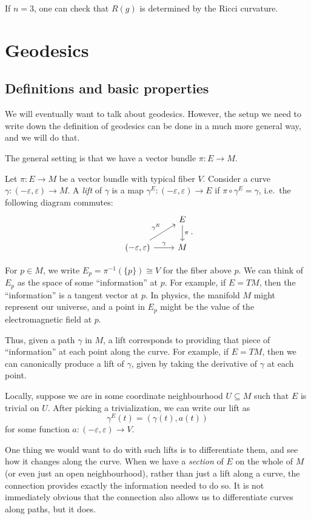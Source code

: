\documentclass[a4paper]{article}
\begin{document}
If $n = 3$, one can check that $R(g)$ is determined by the Ricci curvature.

\section{Geodesics}
\subsection{Definitions and basic properties}
We will eventually want to talk about geodesics. However, the setup we need to write down the definition of geodesics can be done in a much more general way, and we will do that.

The general setting is that we have a vector bundle $\pi: E \to M$.
\begin{defi}[Lift]
  Let $\pi: E \to M$ be a vector bundle with typical fiber $V$. Consider a curve $\gamma: (-\varepsilon, \varepsilon) \to M$. A \emph{lift} of $\gamma$ is a map $\gamma^E: (-\varepsilon, \varepsilon) \to E$ if $\pi \circ \gamma^E = \gamma$, i.e.\ the following diagram commutes:
  \[
    \begin{tikzcd}
      & E \ar[d, "\pi"]\\
      (-\varepsilon, \varepsilon) \ar[r, "\gamma"] \ar[ur, "\gamma^E"] & M
    \end{tikzcd}.
  \]
\end{defi}
For $p \in M$, we write $E_p = \pi^{-1}(\{p\}) \cong V$ for the fiber above $p$. We can think of $E_p$ as the space of some ``information'' at $p$. For example, if $E = TM$, then the ``information'' is a tangent vector at $p$. In physics, the manifold $M$ might represent our universe, and a point in $E_p$ might be the value of the electromagnetic field at $p$.

Thus, given a path $\gamma$ in $M$, a lift corresponds to providing that piece of ``information'' at each point along the curve. For example, if $E = TM$, then we can canonically produce a lift of $\gamma$, given by taking the derivative of $\gamma$ at each point.

Locally, suppose we are in some coordinate neighbourhood $U \subseteq M$ such that $E$ is trivial on $U$. After picking a trivialization, we can write our lift as
\[
  \gamma^E(t) = (\gamma(t), a(t))
\]
for some function $a: (-\varepsilon, \varepsilon) \to V$.

One thing we would want to do with such lifts is to differentiate them, and see how it changes along the curve. When we have a \emph{section} of $E$ on the whole of $M$ (or even just an open neighbourhood), rather than just a lift along a curve, the connection provides exactly the information needed to do so. It is not immediately obvious that the connection also allows us to differentiate curves along paths, but it does.
\end{document}
